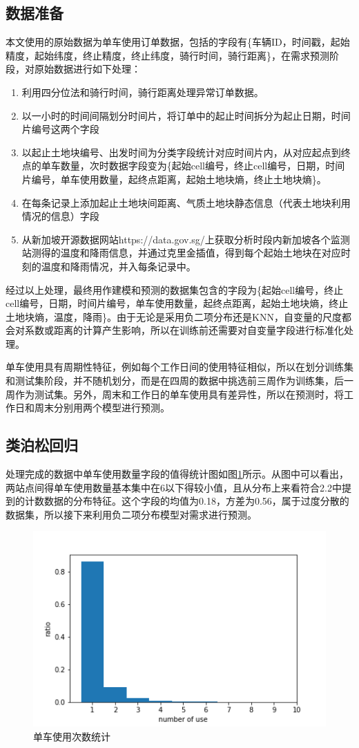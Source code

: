 \documentclass[]{tongjithesis}
\numberwithin{equation}{chapter}
\begin{document}
\subsection{数据准备}
本文使用的原始数据为单车使用订单数据，包括的字段有\{车辆ID，时间戳，起始精度，起始纬度，终止精度，终止纬度，骑行时间，骑行距离\}，在需求预测阶段，对原始数据进行如下处理：
\begin{enumerate}
	\item 利用四分位法和骑行时间，骑行距离处理异常订单数据。
	\item 以一小时的时间间隔划分时间片，将订单中的起止时间拆分为起止日期，时间片编号这两个字段
	\item 以起止土地块编号、出发时间为分类字段统计对应时间片内，从对应起点到终点的单车数量，次时数据字段变为\{起始cell编号，终止cell编号，日期，时间片编号，单车使用数量，起终点距离，起始土地块熵，终止土地块熵\}。
	\item 在每条记录上添加起止土地块间距离、气质土地块静态信息（代表土地块利用情况的信息）字段
	\item 从新加坡开源数据网站https://data.gov.sg/上获取分析时段内新加坡各个监测站测得的温度和降雨信息，并通过克里金插值，得到每个起始土地块在对应时刻的温度和降雨情况，并入每条记录中。
\end{enumerate}

经过以上处理，最终用作建模和预测的数据集包含的字段为\{起始cell编号，终止cell编号，日期，时间片编号，单车使用数量，起终点距离，起始土地块熵，终止土地块熵，温度，降雨\}。由于无论是采用负二项分布还是KNN，自变量的尺度都会对系数或距离的计算产生影响，所以在训练前还需要对自变量字段进行标准化处理。

单车使用具有周期性特征，例如每个工作日间的使用特征相似，所以在划分训练集和测试集阶段，并不随机划分，而是在四周的数据中挑选前三周作为训练集，后一周作为测试集。另外，周末和工作日的单车使用具有差异性，所以在预测时，将工作日和周末分别用两个模型进行预测。

\subsection{类泊松回归}
处理完成的数据中单车使用数量字段的值得统计图如图\ref{usecount}所示。从图中可以看出，两站点间得单车使用数量基本集中在6以下得较小值，且从分布上来看符合2.2中提到的计数数据的分布特征。这个字段的均值为0.18，方差为0.56，属于过度分散的数据集，所以接下来利用负二项分布模型对需求进行预测。
\begin{figure}[H]
	\centering
	\includegraphics[width= 0.7 \textwidth]{figures_main/counthist.png}
	\caption{单车使用次数统计}
	\label{usecount}
\end{figure}
\end{document}

